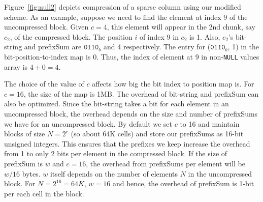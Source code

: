 




Figure~\ref{fig:null2} depicts compression of a sparse column using our modified scheme. As an example, suppose we need to find the element at index 9 of the uncompressed block. Given $c=4$, this element will appear in the 2nd chunk, say $c_2$, of the compressed block. The position $i$ of index 9 in $c_2$ is 1. Also, $c_2$'s bit-string and prefixSum are $\texttt{0110}_b$ and 4 respectively. The entry for ($\texttt{0110}_b$, 1) in the bit-position-to-index map is 0. Thus, the index of element at 9 in non-\texttt{NULL} values array is $4+0 = 4$.

The choice of the value of $c$ affects how big the bit index to position map is. For $c = 16$, the size of the map is 1MB. The overhead of bit-string and prefixSum can also be optimized. Since the bit-string takes a bit for each element in an uncompressed block, the overhead depends on the size and number of prefixSums we have for an uncompressed block. By default we set $c$ to 16 and maintain blocks of size $N=2^c$ (so about 64K cells) and store our prefixSums as 16-bit unsigned integers. This ensures that the prefixes we keep increase the overhead from 1 to only 2 bits per element in the compressed block. If the size of prefixSum is $w$ and $c=16$, the overhead from prefixSums per element will be $w/16$ bytes. $w$ itself depends on the number of elements $N$ in the uncompressed block. For $N=2^{16}=64K$, $w=16$ and hence, the overhead of prefixSum is 1-bit per each cell in the block.

